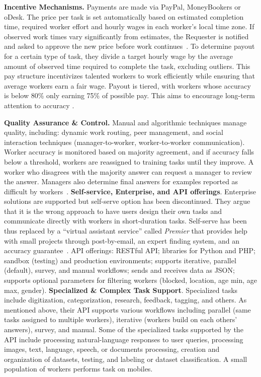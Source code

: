 \documentclass{sigchi}
\begin{document}
{\bf Incentive Mechanisms.} Payments are made via PayPal, MoneyBookers or oDesk. The price per task is set automatically based on estimated completion time, required worker effort and hourly wages in each worker's local time zone. If observed work times vary significantly from estimates, 
the Requester is notified and asked to approve the new price before work continues~\cite{Kulkarni12}.
To determine payout for a certain type of task, they divide a target hourly wage by the average amount of observed time required to complete the task, excluding outliers. This pay structure incentivizes talented workers to work efficiently while ensuring that average workers earn a fair wage. Payout is tiered, with workers whose accuracy is below 80\% only earning 75\% of possible pay. This aims to encourage long-term attention to accuracy \cite{Kulkarni12}.

{\bf Quality Assurance \& Control.} Manual and algorithmic techniques manage quality, including: dynamic work routing, peer management, and social interaction techniques (manager-to-worker, worker-to-worker communication). Worker accuracy is monitored based on majority agreement, and if accuracy falls below a threshold, workers are reassigned to training tasks until they improve. A worker who disagrees with the majority answer can request a manager to review the answer. Managers also determine final answers for examples reported as difficult by workers~\cite{Kulkarni12}. 
{\bf Self-service, Enterprise, and API offerings}. Enterprise solutions are supported but self-serve option has been discontinued. They argue that it is the wrong approach to have users design their own tasks and communicate directly with workers in short-duration tasks. Self-serve has been thus replaced by a ``virtual assistant service'' called {\em Premier} that provides help with small projects through post-by-email, an expert finding system, and an accuracy guarantee~\cite{mw-kulkarni13}. API offerings: RESTful API; libraries for Python and PHP; sandbox (testing) and production environments; supports iterative, parallel (default), survey, and manual workflows; sends and receives data as JSON; supports optional parameters for filtering workers (blocked, location, age min, age max, gender). 
{\bf Specialized \& Complex Task Support}. Specialized tasks include digitization, categorization, research, feedback, tagging, and others. As mentioned above, their API supports various workflows including parallel (same tasks assigned to multiple workers), iterative (workers build on each others' answers), survey, and manual. Some of the specialized tasks supported by the API include processing natural-language responses to user queries, processing images, text, language, speech, or documents processing, creation and organization of datasets, testing, and labeling or dataset classification. A small population of workers performs task on mobiles.
\end{document}
